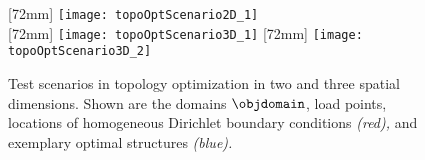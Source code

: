 \begin{figure}
  [72mm]{%
    \texttt{[image: topoOptScenario2D\_1]}%
  }%
  \hfill%
  \\[7mm]%
  [72mm]{%
    \texttt{[image: topoOptScenario3D\_1]}%
  }%
  \hfill%
  [72mm]{%
    \texttt{[image: topoOptScenario3D\_2]}%
  }%
  \caption[Test scenarios in topology optimization]{%
    Test scenarios in topology optimization in
    two and three spatial dimensions.
    Shown are
    the domains $\objdomain$,
    load points,
    locations of homogeneous Dirichlet boundary conditions
    \emph{\textcolor{C1}{(red)},} and
    exemplary optimal structures \emph{\textcolor{C0}{(blue)}.}%
  }%
  \label{fig:topoOptScenario}%
\end{figure}

%
